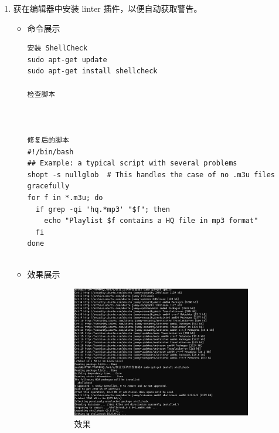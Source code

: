 \documentclass[UTF8]{ctexart}
\begin{document}
\begin{enumerate}
  \item 获在编辑器中安装 linter 插件，以便自动获取警告。
  \begin{itemize}
  \item 命令展示
  \begin{verbatim}
安装 ShellCheck
sudo apt-get update
sudo apt-get install shellcheck

检查脚本



修复后的脚本
#!/bin/bash
## Example: a typical script with several problems
shopt -s nullglob  # This handles the case of no .m3u files gracefully
for f in *.m3u; do
  if grep -qi 'hq.*mp3' "$f"; then
    echo "Playlist $f contains a HQ file in mp3 format"
  fi
done


  \end{verbatim}
\item 效果展示
 \begin{figure}[H]
    \centering
    \begin{subfigure}[b]{0.48\textwidth}
        \includegraphics[width=\textwidth]{121} %
        \caption{效果}
        \label{fig:left}
    \end{subfigure}
    \hfill
    \begin{subfigure}[b]{0.48\textwidth}

\end{subfigure}
\end{figure}
\end{itemize}
\end{enumerate}
\end{document}
